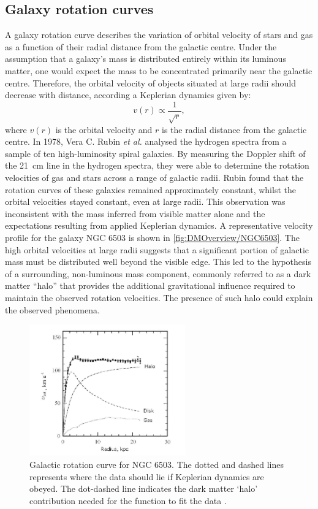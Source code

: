 \subsection{Galaxy rotation curves}\label{sec:DMOverview/RotationCurves}
A galaxy rotation curve describes the variation of orbital velocity of stars and gas as a function of their radial distance from the galactic centre. Under the assumption that a galaxy's mass is distributed entirely within its luminous matter, one would expect the mass to be concentrated primarily near the galactic centre. Therefore, the orbital velocity of objects situated at large radii should decrease with distance, according a Keplerian dynamics given by:
\begin{equation}
v(r) \propto \frac{1}{\sqrt{r}},
\end{equation}
where $v(r)$ is the orbital velocity and $r$ is the radial distance from the galactic centre.
In 1978, Vera C. Rubin \textit{et al.}\cite{Rubin} analysed the hydrogen spectra from a sample of ten high-luminosity spiral galaxies. By measuring the Doppler shift of the 21~cm line in the hydrogen spectra, they were able to determine the rotation velocities of gas and stars across a range of galactic radii. Rubin found that the rotation curves of these galaxies remained approximately constant, whilst the orbital velocities stayed constant, even at large radii. This observation was inconsistent with the mass inferred from visible matter alone and the expectations resulting from applied Keplerian dynamics.
A representative velocity profile for the galaxy NGC 6503 is shown in \autoref{fig:DMOverview/NGC6503}. The high orbital velocities at large radii suggests that a significant portion of galactic mass must be distributed well beyond the visible edge. This led to the hypothesis of a surrounding, non-luminous mass component, commonly referred to as a dark matter ``halo'' that provides the additional gravitational influence required to maintain the observed rotation velocities. The presence of such halo could explain the observed phenomena.
\begin{figure}[ht]
	\centering
	\includegraphics[width = 0.6\textwidth]{figures/DMOverview/NGC_6503.png}
	\caption[Galactic rotation curve for NGC 6503.]{Galactic rotation curve for NGC 6503. The dotted and dashed lines represents where the data should lie if Keplerian dynamics are obeyed. The dot-dashed line indicates the dark matter `halo' contribution needed for the function to fit the data \cite{Freese2009}.}
	\label{fig:DMOverview/NGC6503}
\end{figure}
